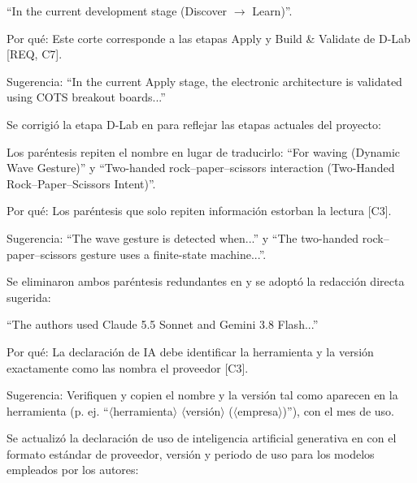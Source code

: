\documentclass{LabDSTresponse}
\begin{document}
{“In the current development stage (Discover $\to$ Learn)”.

Por qué: Este corte corresponde a las etapas Apply y Build \& Validate de D-Lab [REQ, C7].

Sugerencia: “In the current Apply stage, the electronic architecture is validated using COTS breakout boards...”}
{Se corrigió la etapa D-Lab en  para reflejar las etapas actuales del proyecto:
}

{Los paréntesis repiten el nombre en lugar de traducirlo: “For waving (Dynamic Wave Gesture)” y “Two-handed rock–paper–scissors interaction (Two-Handed Rock–Paper–Scissors Intent)”.

Por qué: Los paréntesis que solo repiten información estorban la lectura [C3].

Sugerencia: “The wave gesture is detected when...” y “The two-handed rock–paper–scissors gesture uses a finite-state machine...”.}
{Se eliminaron ambos paréntesis redundantes en  y se adoptó la redacción directa sugerida:
}

{“The authors used Claude 5.5 Sonnet and Gemini 3.8 Flash...”

Por qué: La declaración de IA debe identificar la herramienta y la versión exactamente como las nombra el proveedor [C3].

Sugerencia: Verifiquen y copien el nombre y la versión tal como aparecen en la herramienta (p. ej. “$\langle$herramienta$\rangle$ $\langle$versión$\rangle$ ($\langle$empresa$\rangle$)”), con el mes de uso.}
{Se actualizó la declaración de uso de inteligencia artificial generativa en  con el formato estándar de proveedor, versión y periodo de uso para los modelos empleados por los autores:
}
\end{document}
